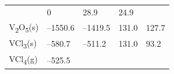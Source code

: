 \documentclass[
  9pt,
]{extbook}
\theoremstyle{definition}
\theoremstyle{definition}
\theoremstyle{definition}
\theoremstyle{remark}
\begin{document}
\begin{longtable}[]{@{}lllll@{}}
\begin{minipage}[t]{0.19\columnwidth}
\end{minipage} & \begin{minipage}[t]{0.20\columnwidth}\raggedright
0\strut
\end{minipage} & \begin{minipage}[t]{0.18\columnwidth}\raggedright
28.9\strut
\end{minipage} & \begin{minipage}[t]{0.18\columnwidth}\raggedright
24.9\strut
\end{minipage}\tabularnewline
\begin{minipage}[t]{0.10\columnwidth}\raggedright
V\textsubscript{2}O\textsubscript{5}(s)\strut
\end{minipage} & \begin{minipage}[t]{0.19\columnwidth}\raggedright
--1550.6\strut
\end{minipage} & \begin{minipage}[t]{0.20\columnwidth}\raggedright
--1419.5\strut
\end{minipage} & \begin{minipage}[t]{0.18\columnwidth}\raggedright
131.0\strut
\end{minipage} & \begin{minipage}[t]{0.18\columnwidth}\raggedright
127.7\strut
\end{minipage}\tabularnewline
\begin{minipage}[t]{0.10\columnwidth}\raggedright
VCl\textsubscript{3}(s)\strut
\end{minipage} & \begin{minipage}[t]{0.19\columnwidth}\raggedright
--580.7\strut
\end{minipage} & \begin{minipage}[t]{0.20\columnwidth}\raggedright
--511.2\strut
\end{minipage} & \begin{minipage}[t]{0.18\columnwidth}\raggedright
131.0\strut
\end{minipage} & \begin{minipage}[t]{0.18\columnwidth}\raggedright
93.2\strut
\end{minipage}\tabularnewline
\begin{minipage}[t]{0.10\columnwidth}\raggedright
VCl\textsubscript{4}(g)\strut
\end{minipage} & \begin{minipage}[t]{0.19\columnwidth}\raggedright
--525.5\strut
\end{minipage} & \begin{minipage}[t]{0.20\columnwidth}\raggedright

\end{minipage}
\end{longtable}
\end{document}
